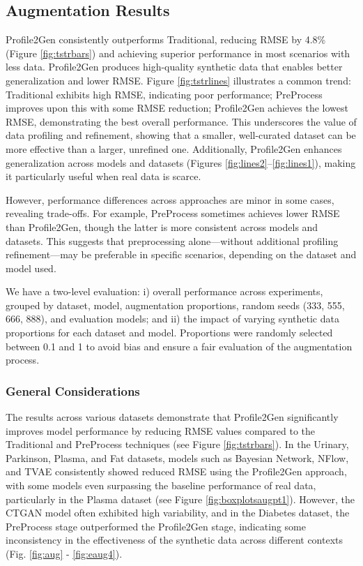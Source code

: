 \documentclass{article}
\theoremstyle{plain}
\theoremstyle{definition}
\theoremstyle{remark}
\begin{document}
\subsection{Augmentation Results} \label{sec:augmenting}


Profile2Gen consistently outperforms Traditional, reducing RMSE by 4.8\% (Figure \ref{fig:tstrbars}) and achieving superior performance in most scenarios with less data. Profile2Gen produces high-quality synthetic data that enables better generalization and lower RMSE.
Figure \ref{fig:tstrlines} illustrates a common trend: Traditional exhibits high RMSE, indicating poor performance; PreProcess improves upon this with some RMSE reduction; Profile2Gen achieves the lowest RMSE, demonstrating the best overall performance. This underscores the value of data profiling and refinement, showing that a smaller, well-curated dataset can be more effective than a larger, unrefined one. Additionally, Profile2Gen enhances generalization across models and datasets (Figures \ref{fig:lines2}–\ref{fig:lines1}), making it particularly useful when real data is scarce.

However, performance differences across approaches are minor in some cases, revealing trade-offs. For example, PreProcess sometimes achieves lower RMSE than Profile2Gen, though the latter is more consistent across models and datasets. This suggests that preprocessing alone—without additional profiling refinement—may be preferable in specific scenarios, depending on the dataset and model used.


We have a two-level evaluation: i) overall performance across experiments, grouped by dataset, model, augmentation proportions, random seeds (333, 555, 666, 888), and evaluation models; and ii) the impact of varying synthetic data proportions for each dataset and model. Proportions were randomly selected between 0.1 and 1 to avoid bias and ensure a fair evaluation of the augmentation process.



\subsubsection{General Considerations}

The results across various datasets demonstrate that  Profile2Gen significantly improves model performance by reducing RMSE values compared to the Traditional and PreProcess techniques (see Figure \ref{fig:tstrbars}). In the Urinary, Parkinson, Plasma, and Fat datasets, models such as Bayesian Network, NFlow, and TVAE consistently showed reduced RMSE using the Profile2Gen approach, with some models even surpassing the baseline performance of real data, particularly in the Plasma dataset (see Figure \ref{fig:boxplotsaugpt1}). However, the CTGAN model often exhibited high variability, and in the Diabetes dataset, the PreProcess stage outperformed the Profile2Gen stage, indicating some inconsistency in the effectiveness of the synthetic data across different contexts (Fig. \ref{fig:aug} - \ref{fig:eaug4}).
\end{document}

